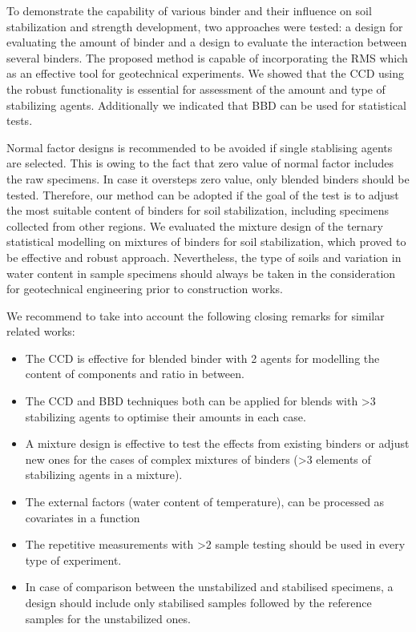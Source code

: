 \documentclass[eprint,
]{actapoly}
\begin{document}
To demonstrate the capability of various binder and their influence on soil stabilization and strength development, two approaches were tested: a design for evaluating the amount of binder and a design to evaluate the interaction between several binders. The proposed method is capable of incorporating the RMS which as an effective tool for geotechnical experiments. We showed that the CCD using the robust functionality is essential for assessment of the amount and type of stabilizing agents. Additionally we indicated that BBD can be used for statistical tests. 

Normal factor designs is recommended to be avoided if single stablising agents are selected. This is owing to the fact that zero value of normal factor includes the raw specimens. In case it oversteps zero value, only blended binders should be tested. Therefore, our method can be adopted if the goal of the test is to adjust the most suitable content of binders for soil stabilization, including specimens collected from other regions. We evaluated the mixture design of the ternary statistical modelling  on mixtures of binders for soil stabilization, which proved to be effective and robust approach. Nevertheless, the type of soils and variation in water content in sample specimens should always be taken in the consideration for geotechnical engineering prior to construction works. 

We recommend to take into account the following closing remarks for similar related works:
\begin{itemize}
	\item The CCD is effective for blended binder with 2 agents for modelling the content of components and ratio in between.
	\item The CCD and BBD techniques both can be applied for blends with >3 stabilizing agents to optimise their amounts in each case.
	\item A mixture design is effective to test the effects from existing binders or adjust new ones for the cases of complex mixtures of binders (>3 elements of stabilizing agents in a mixture).
	\item The external factors (water content of temperature), can be processed as covariates in a function
	\item The repetitive measurements with >2 sample testing should be used in every type of experiment.
	\item In case of comparison between the unstabilized and stabilised specimens, a design should include only stabilised samples followed by the reference samples for the unstabilized ones.
\end{itemize}
\end{document}
